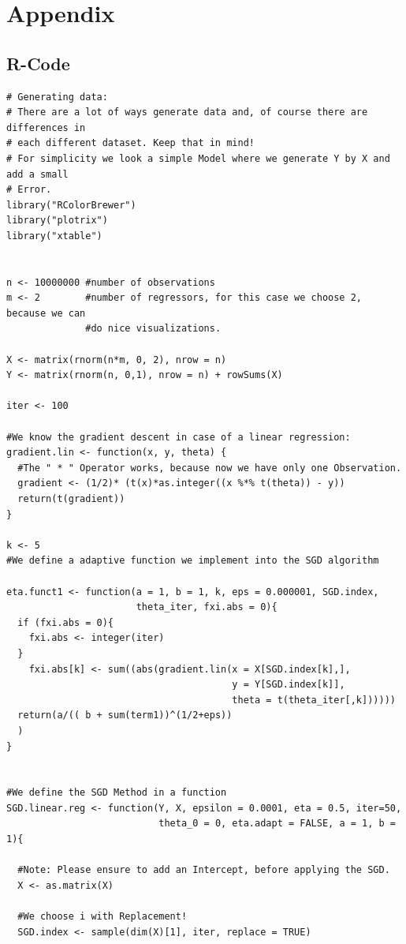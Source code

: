 \documentclass{article}
\begin{document}
\pagebreak



\pagebreak

\section*{Appendix}
\subsection*{R-Code}
\begin{lstlisting}
# Generating data:
# There are a lot of ways generate data and, of course there are differences in
# each different dataset. Keep that in mind!
# For simplicity we look a simple Model where we generate Y by X and add a small
# Error.
library("RColorBrewer")
library("plotrix")
library("xtable")


n <- 10000000 #number of observations
m <- 2        #number of regressors, for this case we choose 2, because we can
              #do nice visualizations. 

X <- matrix(rnorm(n*m, 0, 2), nrow = n)
Y <- matrix(rnorm(n, 0,1), nrow = n) + rowSums(X)

iter <- 100

#We know the gradient descent in case of a linear regression:
gradient.lin <- function(x, y, theta) {
  #The " * " Operator works, because now we have only one Observation.
  gradient <- (1/2)* (t(x)*as.integer((x %*% t(theta)) - y)) 
  return(t(gradient))                                         
}

k <- 5
#We define a adaptive function we implement into the SGD algorithm

eta.funct1 <- function(a = 1, b = 1, k, eps = 0.000001, SGD.index,
                       theta_iter, fxi.abs = 0){
  if (fxi.abs = 0){
    fxi.abs <- integer(iter)
  }
    fxi.abs[k] <- sum((abs(gradient.lin(x = X[SGD.index[k],],
                                        y = Y[SGD.index[k]], 
                                        theta = t(theta_iter[,k])))))
  return(a/(( b + sum(term1))^(1/2+eps))
  )
}


#We define the SGD Method in a function
SGD.linear.reg <- function(Y, X, epsilon = 0.0001, eta = 0.5, iter=50,
                           theta_0 = 0, eta.adapt = FALSE, a = 1, b = 1){
  
  #Note: Please ensure to add an Intercept, before applying the SGD.
  X <- as.matrix(X) 
  
  #We choose i with Replacement!
  SGD.index <- sample(dim(X)[1], iter, replace = TRUE) 
  

\end{lstlisting}
\end{document}
